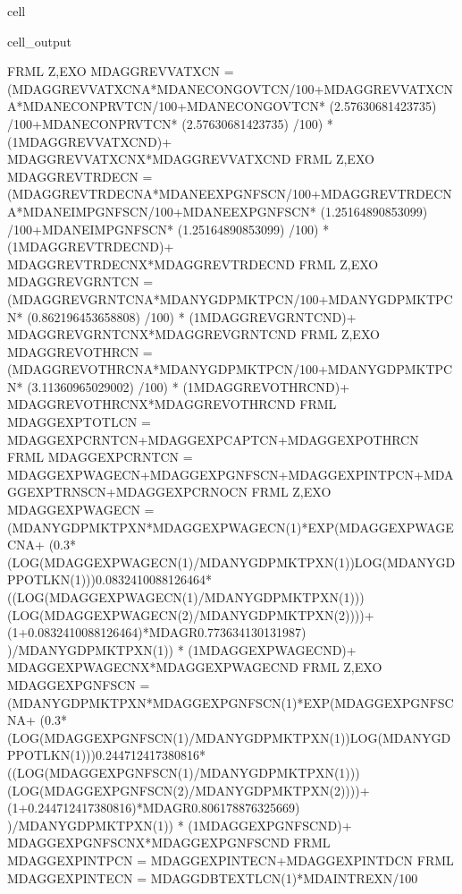 \documentclass[letterpaper,10pt,english]{jupyterBook}
\begin{document}
\begin{sphinxuseclass}{cell}
\begin{sphinxVerbatimOutput}
\begin{sphinxuseclass}{cell_output}
\begin{sphinxVerbatim}[commandchars=\\\{\}]
FRML \PYGZlt{}Z,EXO\PYGZgt{} MDAGGREVVATXCN = (MDAGGREVVATXCN\PYGZus{}A*MDANECONGOVTCN/100+MDAGGREVVATXCN\PYGZus{}A*MDANECONPRVTCN/100+MDANECONGOVTCN* (2.57630681423735) /100+MDANECONPRVTCN* (2.57630681423735) /100) * (1\PYGZhy{}MDAGGREVVATXCN\PYGZus{}D)+ MDAGGREVVATXCN\PYGZus{}X*MDAGGREVVATXCN\PYGZus{}D  \PYGZdl{}
FRML \PYGZlt{}Z,EXO\PYGZgt{} MDAGGREVTRDECN = (MDAGGREVTRDECN\PYGZus{}A*MDANEEXPGNFSCN/100+MDAGGREVTRDECN\PYGZus{}A*MDANEIMPGNFSCN/100+MDANEEXPGNFSCN* (1.25164890853099) /100+MDANEIMPGNFSCN* (1.25164890853099) /100) * (1\PYGZhy{}MDAGGREVTRDECN\PYGZus{}D)+ MDAGGREVTRDECN\PYGZus{}X*MDAGGREVTRDECN\PYGZus{}D  \PYGZdl{}
FRML \PYGZlt{}Z,EXO\PYGZgt{} MDAGGREVGRNTCN = (MDAGGREVGRNTCN\PYGZus{}A*MDANYGDPMKTPCN/100+MDANYGDPMKTPCN* (0.862196453658808) /100) * (1\PYGZhy{}MDAGGREVGRNTCN\PYGZus{}D)+ MDAGGREVGRNTCN\PYGZus{}X*MDAGGREVGRNTCN\PYGZus{}D  \PYGZdl{}
FRML \PYGZlt{}Z,EXO\PYGZgt{} MDAGGREVOTHRCN = (MDAGGREVOTHRCN\PYGZus{}A*MDANYGDPMKTPCN/100+MDANYGDPMKTPCN* (3.11360965029002) /100) * (1\PYGZhy{}MDAGGREVOTHRCN\PYGZus{}D)+ MDAGGREVOTHRCN\PYGZus{}X*MDAGGREVOTHRCN\PYGZus{}D  \PYGZdl{}
FRML  \PYGZlt{}\PYGZgt{} MDAGGEXPTOTLCN = MDAGGEXPCRNTCN+MDAGGEXPCAPTCN+MDAGGEXPOTHRCN \PYGZdl{}
FRML  \PYGZlt{}\PYGZgt{} MDAGGEXPCRNTCN = MDAGGEXPWAGECN+MDAGGEXPGNFSCN+MDAGGEXPINTPCN+MDAGGEXPTRNSCN+MDAGGEXPCRNOCN \PYGZdl{}
FRML \PYGZlt{}Z,EXO\PYGZgt{} MDAGGEXPWAGECN = (MDANYGDPMKTPXN*MDAGGEXPWAGECN(\PYGZhy{}1)*EXP(MDAGGEXPWAGECN\PYGZus{}A+ (\PYGZhy{}0.3*(LOG(MDAGGEXPWAGECN(\PYGZhy{}1)/MDANYGDPMKTPXN(\PYGZhy{}1))\PYGZhy{}LOG(MDANYGDPPOTLKN(\PYGZhy{}1)))\PYGZhy{}0.0832410088126464*((LOG(MDAGGEXPWAGECN(\PYGZhy{}1)/MDANYGDPMKTPXN(\PYGZhy{}1)))\PYGZhy{}(LOG(MDAGGEXPWAGECN(\PYGZhy{}2)/MDANYGDPMKTPXN(\PYGZhy{}2))))+(1+0.0832410088126464)*MDAGR\PYGZhy{}0.773634130131987) )/MDANYGDPMKTPXN(\PYGZhy{}1)) * (1\PYGZhy{}MDAGGEXPWAGECN\PYGZus{}D)+ MDAGGEXPWAGECN\PYGZus{}X*MDAGGEXPWAGECN\PYGZus{}D  \PYGZdl{}
FRML \PYGZlt{}Z,EXO\PYGZgt{} MDAGGEXPGNFSCN = (MDANYGDPMKTPXN*MDAGGEXPGNFSCN(\PYGZhy{}1)*EXP(MDAGGEXPGNFSCN\PYGZus{}A+ (\PYGZhy{}0.3*(LOG(MDAGGEXPGNFSCN(\PYGZhy{}1)/MDANYGDPMKTPXN(\PYGZhy{}1))\PYGZhy{}LOG(MDANYGDPPOTLKN(\PYGZhy{}1)))\PYGZhy{}0.244712417380816*((LOG(MDAGGEXPGNFSCN(\PYGZhy{}1)/MDANYGDPMKTPXN(\PYGZhy{}1)))\PYGZhy{}(LOG(MDAGGEXPGNFSCN(\PYGZhy{}2)/MDANYGDPMKTPXN(\PYGZhy{}2))))+(1+0.244712417380816)*MDAGR\PYGZhy{}0.806178876325669) )/MDANYGDPMKTPXN(\PYGZhy{}1)) * (1\PYGZhy{}MDAGGEXPGNFSCN\PYGZus{}D)+ MDAGGEXPGNFSCN\PYGZus{}X*MDAGGEXPGNFSCN\PYGZus{}D  \PYGZdl{}
FRML  \PYGZlt{}\PYGZgt{} MDAGGEXPINTPCN = MDAGGEXPINTECN+MDAGGEXPINTDCN \PYGZdl{}
FRML  \PYGZlt{}\PYGZgt{} MDAGGEXPINTECN = MDAGGDBTEXTLCN(\PYGZhy{}1)*MDAINTREXN/100 \PYGZdl{}

\end{sphinxVerbatim}
\end{sphinxuseclass}
\end{sphinxVerbatimOutput}
\end{sphinxuseclass}
\end{document}
